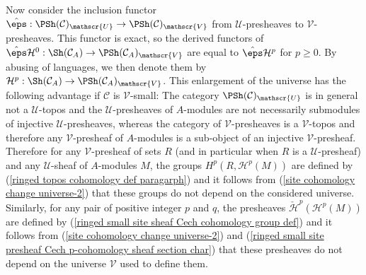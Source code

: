 Now consider the inclusion functor $\hat{\eps}:\PSh(\mathcal{C})_\mathscr{U}\to \PSh(\mathcal{C})_\mathscr{V}$ from $\mathscr{U}$-presheaves to $\mathscr{V}$-presheaves. This functor is exact, so the derived functors of $\hat{\eps}\mathcal{H}^0:\Sh(\mathcal{C}_A)\to \PSh(\mathcal{C}_A)_\mathscr{V}$ are equal to $\hat{\eps}\mathcal{H}^p$ for $p\geq 0$. By abusing of languages, we then denote them by $\mathcal{H}^p:\Sh(\mathcal{C}_A)\to \PSh(\mathcal{C}_A)_\mathscr{V}$. This enlargement of the universe has the following advantage if $\mathcal{C}$ is $\mathscr{V}$-small: The category $\PSh(\mathcal{C})_\mathscr{U}$ is in general not a $\mathscr{U}$-topos and the $\mathscr{U}$-presheaves of $A$-modules are not necessarily submodules of injective $\mathscr{U}$-presheaves, whereas the category of $\mathscr{V}$-presheaves is a $\mathscr{V}$-topos and therefore any $\mathscr{V}$-presheaf of $A$-modules is a sub-object of an injective $\mathscr{V}$-presheaf. Therefore for any $\mathscr{V}$-presheaf of sets $R$ (and in particular when $R$ is a $\mathscr{U}$-presheaf) and any $\mathscr{U}$-sheaf of $A$-modules $M$, the groups $H^p(R,\mathcal{H}^p(M))$ are defined by (\ref{ringed topos cohomology def paragarph}) and it follows from (\ref{site cohomology change universe-2}) that these groups do not depend on the considered universe. Similarly, for any pair of positive integer $p$ and $q$, the presheaves $\check{\mathcal{H}}^p(\mathcal{H}^p(M))$ are defined by (\ref{ringed small site sheaf Cech cohomology group def}) and it follows from (\ref{site cohomology change universe-2}) and (\ref{ringed small site presheaf Cech p-cohomology sheaf section char}) that these presheaves do not depend on the universe $\mathscr{V}$ used to define them.

